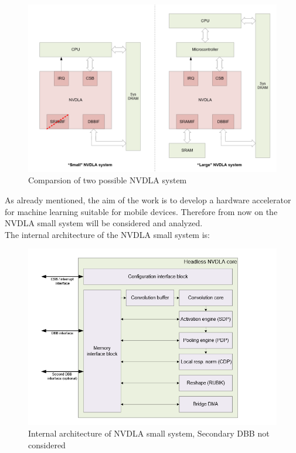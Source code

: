 \begin{figure}[!htbp]
\centering
\captionsetup{justification=centering}
\includegraphics[scale=0.4]{./figure/nvdla_system.PNG}
\caption{Comparsion of two possible NVDLA system \cite{WEBSITE:8}}
\label{fig:nvdlasystem}
\end{figure}
As already mentioned, the aim of the work is to develop a hardware accelerator for machine learning suitable for mobile devices. Therefore from now on the NVDLA small system will be considered and analyzed.\\
The internal architecture of the NVDLA small system is:
\begin{figure}[!htbp]
\centering
\captionsetup{justification=centering}
\includegraphics[scale=0.5]{./figure/nvdla_internal.PNG}
\centering\caption{Internal architecture of NVDLA small system, Secondary DBB not considered \cite{WEBSITE:8}}
\label{fig:nvdlaarch}
\end{figure}

